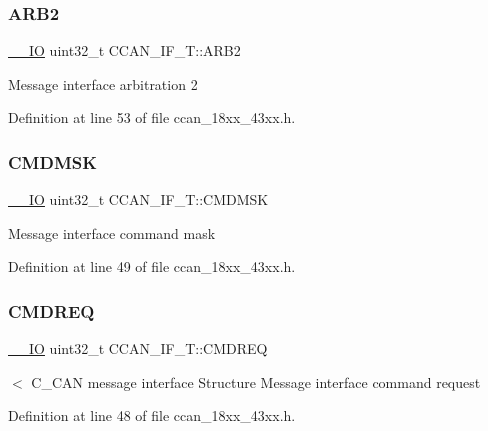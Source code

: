 \subsubsection{\texorpdfstring{A\+R\+B2}{ARB2}}
{\footnotesize\ttfamily \hyperlink{core__sc300_8h_aec43007d9998a0a0e01faede4133d6be}{\+\_\+\+\_\+\+IO} uint32\+\_\+t C\+C\+A\+N\+\_\+\+I\+F\+\_\+\+T\+::\+A\+R\+B2}

Message interface arbitration 2 

Definition at line 53 of file ccan\+\_\+18xx\+\_\+43xx.\+h.

\mbox{\label{struct_c_c_a_n___i_f___t_ac3b55799e4ebd519eb4d3860f4fe3ec6}} 
\subsubsection{\texorpdfstring{C\+M\+D\+M\+SK}{CMDMSK}}
{\footnotesize\ttfamily \hyperlink{core__sc300_8h_aec43007d9998a0a0e01faede4133d6be}{\+\_\+\+\_\+\+IO} uint32\+\_\+t C\+C\+A\+N\+\_\+\+I\+F\+\_\+\+T\+::\+C\+M\+D\+M\+SK}

Message interface command mask 

Definition at line 49 of file ccan\+\_\+18xx\+\_\+43xx.\+h.

\mbox{\label{struct_c_c_a_n___i_f___t_a2c723b6817fc390287b469e16a8f828e}} 
\subsubsection{\texorpdfstring{C\+M\+D\+R\+EQ}{CMDREQ}}
{\footnotesize\ttfamily \hyperlink{core__sc300_8h_aec43007d9998a0a0e01faede4133d6be}{\+\_\+\+\_\+\+IO} uint32\+\_\+t C\+C\+A\+N\+\_\+\+I\+F\+\_\+\+T\+::\+C\+M\+D\+R\+EQ}

$<$ C\+\_\+\+C\+AN message interface Structure Message interface command request 

Definition at line 48 of file ccan\+\_\+18xx\+\_\+43xx.\+h.

\mbox{\label{struct_c_c_a_n___i_f___t_a435a452b981137baab3e2f73c5ee1749}} 
